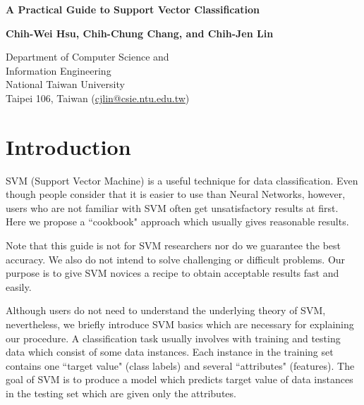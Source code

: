 \documentclass[12pt]{article}
\begin{document}
\setlength{\baselineskip}{18pt}
\begin{center}
{\Large\bf A Practical Guide to Support Vector Classification}

\bigskip

{\bf Chih-Wei Hsu, Chih-Chung Chang, and
 Chih-Jen Lin}\\
\medskip

Department of Computer Science and \\
Information Engineering \\
National Taiwan University \\
Taipei 106, Taiwan (\href{mailto:cjlin@csie.ntu.edu.tw}
{cjlin@csie.ntu.edu.tw})

\end{center}
\medskip


\begin{abstract}
Support vector machine (SVM) is a popular technique for 
classification. However, beginners who 
are not familiar with SVM often get 
unsatisfactory results since they miss some easy but 
significant steps. In this guide, we propose a 
simple procedure which usually gives reasonable results. 
\end{abstract}

\section{Introduction}
\label{intro}
SVM (Support Vector Machine) is a useful technique for data
classification. Even though people consider that it is easier
to use than Neural Networks, however, users who are not 
familiar with SVM often get unsatisfactory results at first.
Here we propose a ``cookbook" approach which usually gives 
reasonable results. 

Note that this guide is not for SVM researchers nor do 
we guarantee the best accuracy. We also do not intend 
to solve challenging or difficult problems. Our purpose 
is to give SVM novices a recipe to obtain acceptable 
results fast and easily.

Although users do not need to understand the underlying 
theory of SVM, nevertheless, we briefly introduce SVM
basics which are necessary for explaining
our procedure. A classification task usually involves 
with training and testing data which 
consist of some data instances. Each instance in the  
training set contains one ``target value" (class labels) 
and several ``attributes" (features). 
The goal of SVM is to produce a model which 
predicts target value of data instances in the testing 
set which are given only the attributes.
\end{document}
